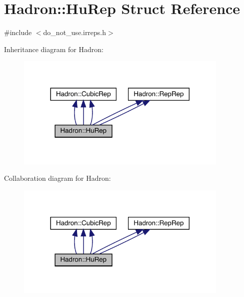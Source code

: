 \hypertarget{structHadron_1_1HuRep}{}\section{Hadron\+:\+:Hu\+Rep Struct Reference}
\label{structHadron_1_1HuRep}


{\ttfamily \#include $<$do\+\_\+not\+\_\+use.\+irreps.\+h$>$}



Inheritance diagram for Hadron\+:
\nopagebreak
\begin{figure}[H]
\begin{center}
\leavevmode
\includegraphics[width=288pt]{dd/db9/structHadron_1_1HuRep__inherit__graph}
\end{center}
\end{figure}


Collaboration diagram for Hadron\+:
\nopagebreak
\begin{figure}[H]
\begin{center}
\leavevmode
\includegraphics[width=288pt]{df/da6/structHadron_1_1HuRep__coll__graph}
\end{center}
\end{figure}
